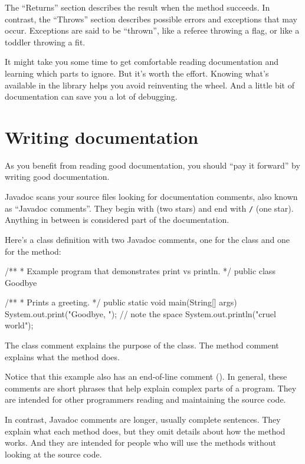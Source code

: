 The ``Returns'' section describes the result when the method succeeds.
In contrast, the ``Throws'' section describes possible errors and exceptions that may occur.
Exceptions are said to be ``thrown'', like a referee throwing a flag, or like a toddler throwing a fit.

It might take you some time to get comfortable reading documentation and learning which parts to ignore.
But it's worth the effort.
Knowing what's available in the library helps you avoid reinventing the wheel.
And a little bit of documentation can save you a lot of debugging.


\section{Writing documentation}

As you benefit from reading good documentation, you should ``pay it forward'' by writing good documentation.


Javadoc scans your source files looking for documentation comments, also known as ``Javadoc comments''.
They begin with \java{/**} (two stars) and end with \textcolor{comment}{\tt */} (one star).
Anything in between is considered part of the documentation.

Here's a class definition with two Javadoc comments, one for the  class and one for the  method:

\begin{code}
/**
 * Example program that demonstrates print vs println.
 */
public class Goodbye {

    /**
     * Prints a greeting.
     */
    public static void main(String[] args) {
        System.out.print("Goodbye, ");  // note the space
        System.out.println("cruel world");
    }
}
\end{code}

The class comment explains the purpose of the class.
The method comment explains what the method does.

Notice that this example also has an end-of-line comment (\java{//}).
In general, these comments are short phrases that help explain complex parts of a program.
They are intended for other programmers reading and maintaining the source code.

In contrast, Javadoc comments are longer, usually complete sentences.
They explain what each method does, but they omit details about how the method works.
And they are intended for people who will use the methods without looking at the source code.

